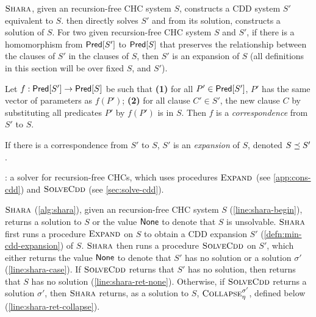$\textsc{Shara}$, given an recursion-free CHC system $S$,
constructs a CDD system $S'$ equivalent to $S$.
%
\sys then directly solves $S'$ and from its solution,
constructs a solution of $S$.
For two given recursion-free CHC system $S$ and $S'$, if
there is a homomorphism from $\mathsf{Pred}[ S' ]$ to $\mathsf{Pred}[ S ]$ that
preserves the relationship between the clauses of $S'$ in
the clauses of $S$, then $S'$ is an expansion of
$S$ (all definitions in this section will be over fixed
$S$, and $S'$).
\begin{defn}
  \label{defn:expansion}
  Let $f : \mathsf{Pred}[ S' ] \to \mathsf{Pred}[ S ]$ be such that
  \textbf{(1)} for all $P' \in \mathsf{Pred}[ S' ]$, $P'$ has the
  same vector of parameters as $f(P')$;
  \textbf{(2)} for all clause $C' \in S'$, the new clause $C$
  by substituting all predicates $P'$ by $f(P')$ is in $S$.
  Then $f$ is a \emph{correspondence} from $S'$ to $S$.
\end{defn}
%
If there is a correspondence from $S'$ to $S$,
$S'$ is an \emph{expansion} of $S$, denoted
$S \preceq S'$.
%

\begin{algorithm}[t]
  \caption{\sys: a solver for recursion-free CHCs, which uses
    procedures $\textsc{Expand}_{}$ (see \autoref{app:cons-cdd}) and
    $\textsc{SolveCdd}$ (see
    \autoref{sec:solve-cdd}). }
  \label{alg:shara}
\end{algorithm}
$\textsc{Shara}$ (\autoref{alg:shara}), given an recursion-free CHC system $S$ (\autoref{line:shara-begin}), 
returns a solution
to $S$ or the value $\mathsf{None}$ to denote that $S$ is
unsolvable.
%
$\textsc{Shara}$ first runs a procedure $\textsc{Expand}_{}$ on $S$ to obtain a CDD expansion $S'$ (\autoref{defn:min-cdd-expansion})
of $S$.
%
$\textsc{Shara}$ then runs a procedure $\textsc{SolveCdd}$ on $S'$, which either returns the value
$\mathsf{None}$ to denote that $S'$ has no solution or a solution
$\sigma'$ (\autoref{line:shara-case}).
%
If $\textsc{SolveCdd}$ returns that $S'$ has
no solution, then \sys returns that $S$ has no solution
(\autoref{line:shara-ret-none}).
%
Otherwise, if $\textsc{SolveCdd}$ returns a solution
$\sigma'$, then $\mbox{\textsc{Shara}}$ returns, as a solution to $S$,
$\textsc{Collapse}_{ \eta }^{ \sigma' }$, defined below
(\autoref{line:shara-ret-collapse}).

